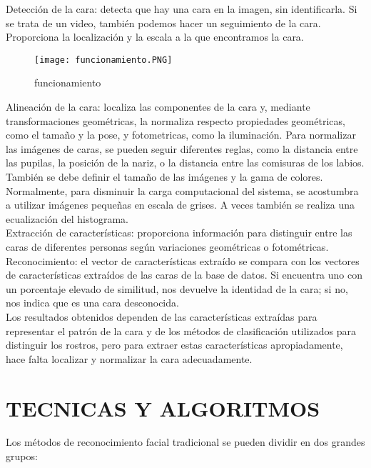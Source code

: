 \documentclass[a4paper,11pt]{article}
\begin{document}
 Detección de la cara: detecta que hay una cara en la imagen, sin identificarla. Si se trata de un video, también podemos hacer un seguimiento de la cara. Proporciona la localización y la escala a la que encontramos la cara.\\
 	\begin{figure}[h]
 		\centering
 	\texttt{[image: funcionamiento.PNG]}
 	\caption{funcionamiento }
 	\label{fig:funcionamiento}
 \end{figure}
 Alineación de la cara: localiza las componentes de la cara y, mediante transformaciones geométricas, la normaliza respecto propiedades geométricas, como el tamaño y la pose, y fotometricas, como la iluminación. Para normalizar las imágenes de caras, se pueden seguir diferentes reglas, como la distancia entre las pupilas, la posición de la nariz, o la distancia entre las comisuras de los labios.\\ También se debe definir el tamaño de las imágenes y la gama de colores. Normalmente, para disminuir la carga computacional del sistema, se acostumbra a utilizar imágenes pequeñas en escala de grises. A veces también se realiza una ecualización del histograma.\\
 
 Extracción de características: proporciona información para distinguir entre las caras de diferentes personas según variaciones geométricas o fotométricas.\\
 Reconocimiento: el vector de características extraído se compara con los vectores de características extraídos de las caras de la base de datos. Si encuentra uno con un porcentaje elevado de similitud, nos devuelve la identidad de la cara; si no, nos indica que es una cara desconocida.\\
 
 Los resultados obtenidos dependen de las características extraídas para representar el patrón de la cara y de los métodos de clasificación utilizados para distinguir los rostros, pero para extraer estas características apropiadamente, hace falta localizar y normalizar la cara adecuadamente. \\
 
 
 
\section{TECNICAS Y ALGORITMOS}
 Los métodos de reconocimiento facial tradicional se pueden dividir en dos grandes grupos:
 
\end{document}
